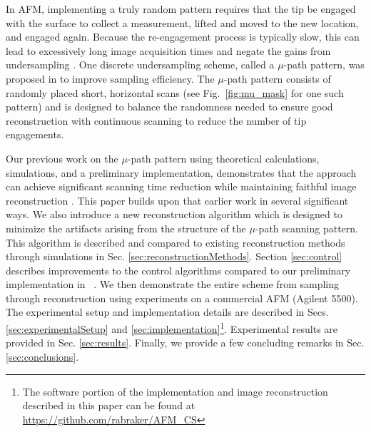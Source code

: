 \documentclass[twocolumn,oneside]{IEEEtran/IEEEtran}
\begin{document}
In AFM, implementing a truly random pattern requires that the tip be engaged
with the surface to collect a measurement, lifted and moved to the new location,
and engaged again. Because the re-engagement process is typically slow, this can
lead to excessively long image acquisition times and negate the gains from
undersampling \cite{andersson2012non}. One discrete undersampling scheme, called
a $\mu$-path pattern, was proposed in \cite{maxwell2014compressed} to improve
sampling efficiency. The $\mu$-path pattern consists of randomly placed short,
horizontal scans (see Fig.~\ref{fig:mu_mask} for one such pattern) and is
designed to balance the randomness needed to ensure good reconstruction with
continuous scanning to reduce the number of tip
engagements. %

Our previous work on the $\mu$-path pattern using theoretical calculations,
simulations, and a preliminary implementation, demonstrates that the approach
can achieve significant scanning time reduction while maintaining faithful image
reconstruction \cite{maxwell2014compressed,Luo:2015tu, braker_hardware_2018}. This paper
builds upon that earlier work in several significant ways.
We also introduce a new reconstruction
algorithm which is designed to minimize the artifacts arising from the structure
of the $\mu$-path scanning pattern. This algorithm is described and compared to
existing reconstruction methods through simulations in Sec.
\ref{sec:reconstructionMethods}.
Section \ref{sec:control} describes improvements to the control algorithms compared to our preliminary implementation in ~\cite{braker_hardware_2018}.
We then demonstrate the entire scheme from
sampling through reconstruction using experiments on a commercial AFM (Agilent
5500). The experimental setup and implementation details are described in Secs.
\ref{sec:experimentalSetup} and \ref{sec:implementation}\footnote{The software
  portion of the implementation and image reconstruction described in this paper
  can be found at \url{https://github.com/rabraker/AFM_CS}}. Experimental results are provided in Sec.
\ref{sec:results}. Finally, we provide a few concluding remarks in
Sec. \ref{sec:conclusions}.
\end{document}
